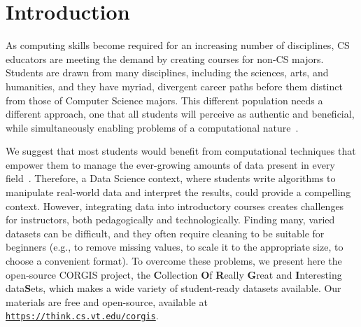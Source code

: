 \documentclass{sig-alternate}
\begin{document}



%
%

%
%
\printccsdesc


\newpage
\section{Introduction}

As computing skills become required for an increasing number of disciplines, CS educators are meeting the demand by creating courses for non-CS majors.
Students are drawn from many disciplines, including the sciences, arts, and humanities, and they have myriad, divergent career paths before them distinct from those of Computer Science majors.
This different population needs a different approach, one that all students will perceive as authentic and beneficial, while simultaneously enabling problems of a computational nature~\cite{guzdial2006imagineering}.

We suggest that most students would benefit from computational techniques that empower them to manage the ever-growing amounts of data present in every field~\cite{manyika2011big}.
Therefore, a Data Science context, where students write algorithms to manipulate real-world data and interpret the results, could provide a compelling context.
However, integrating data into introductory courses creates challenges for instructors, both pedagogically and technologically.
Finding many, varied datasets can be difficult, and they often require cleaning to be suitable for beginners (e.g., to remove missing values, to scale it to the appropriate size, to choose a convenient format).
To overcome these problems, we present here the open-source CORGIS project, the \textbf{C}ollection \textbf{O}f \textbf{R}eally \textbf{G}reat and \textbf{I}nteresting data\textbf{S}ets, which makes a wide variety of student-ready datasets available.
Our materials are free and open-source, available at  \texttt{\url{https://think.cs.vt.edu/corgis}}.
\end{document}
